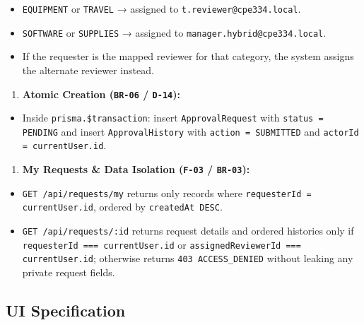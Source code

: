 \documentclass[11pt,a4paper]{article}
\begin{document}
\begin{itemize}[leftmargin=*,itemsep=2pt,topsep=2pt]
  \item \texttt{EQUIPMENT} or \texttt{TRAVEL} → assigned to \texttt{t.reviewer@cpe334.local}.
  \item \texttt{SOFTWARE} or \texttt{SUPPLIES} → assigned to \texttt{manager.hybrid@cpe334.local}.
  \item If the requester is the mapped reviewer for that category, the system assigns the alternate reviewer instead.
\end{itemize}
\begin{enumerate}[leftmargin=*,itemsep=2pt,topsep=2pt]
  \item \textbf{Atomic Creation (\texttt{BR-06} / \texttt{D-14}):}
\end{enumerate}
\begin{itemize}[leftmargin=*,itemsep=2pt,topsep=2pt]
  \item Inside \texttt{prisma.\$transaction}: insert \texttt{ApprovalRequest} with \texttt{status = PENDING} and insert \texttt{ApprovalHistory} with \texttt{action = SUBMITTED} and \texttt{actorId = currentUser.id}.
\end{itemize}
\begin{enumerate}[leftmargin=*,itemsep=2pt,topsep=2pt]
  \item \textbf{My Requests \& Data Isolation (\texttt{F-03} / \texttt{BR-03}):}
\end{enumerate}
\begin{itemize}[leftmargin=*,itemsep=2pt,topsep=2pt]
  \item \texttt{GET /api/requests/my} returns only records where \texttt{requesterId = currentUser.id}, ordered by \texttt{createdAt DESC}.
  \item \texttt{GET /api/requests/:id} returns request details and ordered histories only if \texttt{requesterId === currentUser.id} or \texttt{assignedReviewerId === currentUser.id}; otherwise returns \texttt{403 ACCESS\_DENIED} without leaking any private request fields.
\end{itemize}

\subsection{UI Specification}
\end{document}
